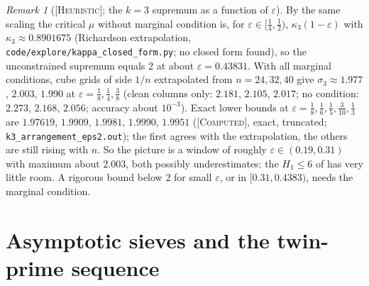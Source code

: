 \documentclass[11pt]{amsart}
\theoremstyle{definition}
\theoremstyle{remark}
\newtheorem{remark}[theorem]{Remark}
\newcommand{\lbl}[1]{\textup{\textsc{[#1]}}}
\begin{document}
\begin{remark}[\lbl{Heuristic}; the $k=3$ supremum as a function of $\varepsilon$]\label{rem:k3-window}
By the same scaling the critical $\mu$ without marginal condition is, for
$\varepsilon\in[\frac14,\frac12)$, $\kappa_3(1-\varepsilon)$ with $\kappa_3\approx0.8901675$ (Richardson extrapolation,
\texttt{code/}\allowbreak\texttt{explore/}\allowbreak\texttt{kappa\_closed\_form.py}; no closed form
found), so the unconstrained supremum equals $2$ at about $\varepsilon=0.43831$.
With all marginal conditions, cube grids of side $1/n$ extrapolated from
$n=24,32,40$ give $\sigma_3\approx1.977$, $2.003$, $1.990$ at
$\varepsilon=\frac18,\frac14,\frac38$ (clean columns only: $2.181$, $2.105$, $2.017$;
no condition: $2.273$, $2.168$, $2.056$; accuracy about $10^{-3}$). Exact lower
bounds at $\varepsilon=\frac18,\frac16,\frac15,\frac3{10},\frac13$ are $1.97619$, $1.9909$,
$1.9981$, $1.9990$, $1.9951$ (\lbl{Computed}, exact, truncated;
\texttt{k3\_arrangement\_eps2.out}); the first agrees with the extrapolation, the
others are still rising with $n$. So the picture is a window
of roughly $\varepsilon\in(0.19,0.31)$ with maximum about $2.003$, both possibly
underestimates: the $H_1\le6$ of \cite[Theorem~3.15]{PM8b} has very little
room. A rigorous bound below $2$ for small $\varepsilon$, or in $[0.31,0.4383)$,
needs the marginal condition.
\end{remark}

\section{Asymptotic sieves and the twin-prime sequence}\label{sec:fi}
\end{document}

